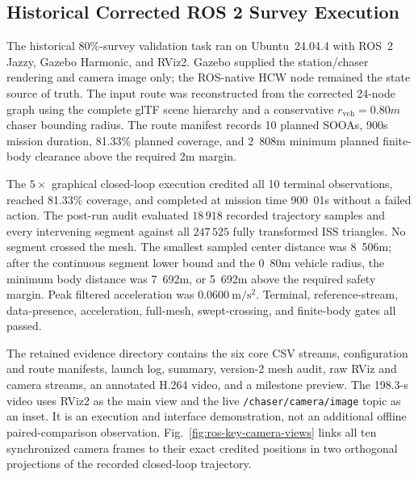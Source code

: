 \subsection{Historical Corrected ROS 2 Survey Execution}
\label{sec:ros-verification-results}

The historical 80\%-survey validation task ran on Ubuntu~24.04.4 with ROS~2 Jazzy,
Gazebo Harmonic, and RViz2. Gazebo supplied the station/chaser rendering and
camera image only; the ROS-native HCW node remained the state source of truth.
The input route was reconstructed from the corrected 24-node graph using the
complete glTF scene hierarchy and a conservative
$r_{\mathrm{veh}}=\unit{0.80}{m}$ chaser bounding radius. The route manifest
records 10 planned SOOAs, \unit{900}{s} mission duration, 81.33\% planned
coverage, and \unit{2.808}{m} minimum planned finite-body clearance above the
required \unit{2}{m} margin.

The $5\times$ graphical closed-loop execution credited all 10 terminal
observations, reached 81.33\% coverage, and completed at mission time
\unit{900.01}{s} without a failed action. The post-run audit evaluated $18\,918$
recorded trajectory samples and every intervening segment against all $247\,525$
fully transformed ISS triangles. No segment crossed the mesh. The smallest
sampled center distance was \unit{8.506}{m}; after the continuous segment lower
bound and the \unit{0.80}{m} vehicle radius, the minimum body distance was
\unit{7.692}{m}, or \unit{5.692}{m} above the required safety margin. Peak
filtered acceleration was $0.0600~\mathrm{m/s^2}$. Terminal, reference-stream,
data-presence, acceleration, full-mesh, swept-crossing, and finite-body gates
all passed.

The retained evidence directory contains the six core CSV streams,
configuration and route manifests, launch log, summary, version-2 mesh audit,
raw RViz and camera streams, an annotated H.264 video, and a milestone preview.
The 198.3-s video uses RViz2 as the main view and the live
\texttt{/chaser/camera/image} topic as an inset. It is an execution and
interface demonstration, not an additional offline paired-comparison observation.
Fig.~\ref{fig:ros-key-camera-views} links all ten synchronized camera frames
to their exact credited positions in two orthogonal projections of the recorded
closed-loop trajectory.

